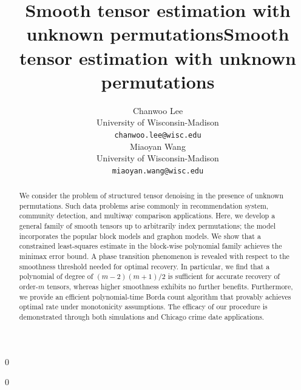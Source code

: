 \documentclass{article}
\newcommand{\blind}{0}
\theoremstyle{definition}
\begin{document}
\blind
{   \title{Smooth tensor estimation with 
unknown permutations}
\author{%
  Chanwoo Lee \\
  University of Wisconsin-Madison\\
  \texttt{chanwoo.lee@wisc.edu} \\
   \And
   Miaoyan Wang \\
   University of Wisconsin-Madison \\
   \texttt{miaoyan.wang@wisc.edu} }

    \maketitle
} \fi

\blind
{
 \date{}
  \title{Smooth tensor estimation with unknown permutations}
\author{}
\maketitle
} \fi

\vspace{-.3cm}
\begin{abstract}
 We consider the problem of structured tensor denoising in the presence of unknown permutations. Such data problems arise commonly in recommendation system, community detection, and multiway comparison applications. Here, we develop a general family of smooth tensors up to arbitrarily index permutations; the model incorporates the popular block models and graphon models. We show that a constrained least-squares estimate in the block-wise polynomial family achieves the minimax error bound. A phase transition phenomenon is revealed with respect to the smoothness threshold needed for optimal recovery. In particular, we find that a polynomial of degree of $(m-2)(m+1)/2$ is sufficient for accurate recovery of order-$m$ tensors, whereas higher smoothness exhibits no further benefits. Furthermore, we provide an efficient polynomial-time Borda count algorithm that provably achieves optimal rate under monotonicity assumptions. The efficacy of our procedure is demonstrated through both simulations and Chicago crime date applications. 
\end{abstract}
\end{document}
